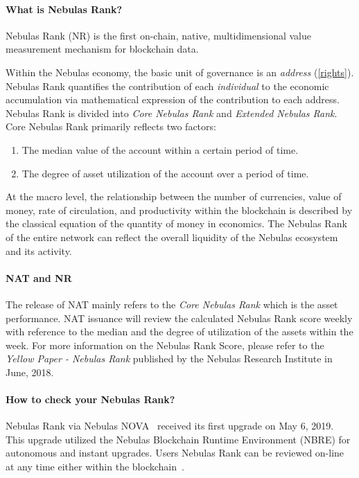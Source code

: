 \begin{center}
\colorbox{yellow!30}{
\begin{minipage}[c]{.8\textwidth}
	\paragraph{What is Nebulas Rank?}
	Nebulas Rank (NR) is the first on-chain, native, multidimensional value measurement mechanism for blockchain data.

  Within the Nebulas economy, the basic unit of governance is an \emph{address}
  (\ref{rights}). Nebulas Rank quantifies the contribution of each
  \emph{individual} to the economic accumulation via mathematical expression of
  the contribution to each address. Nebulas Rank is divided into \emph{Core
  Nebulas Rank} and \emph{Extended Nebulas Rank}. Core Nebulas Rank primarily reflects two factors:

	\begin{enumerate}
		\item The median value of the account within a certain period of time.
		\item The degree of asset utilization of the account over a period of time.
	\end{enumerate}

	At the macro level, the relationship between the number of currencies, value of money, rate of circulation, and productivity within the blockchain is described by the classical equation of the quantity of money in economics. The Nebulas Rank of the entire network can reflect the overall liquidity of the Nebulas ecosystem and its activity.


	\paragraph{NAT and NR}

  The release of NAT mainly refers to the \emph{Core Nebulas Rank} which is the asset performance. NAT issuance will review the calculated Nebulas Rank score weekly with reference to the median and the degree of utilization of the assets within the week. For more information on the Nebulas Rank Score, please refer to the \textit{Yellow Paper - Nebulas Rank} published by the Nebulas Research Institute in June, 2018.


	\paragraph{How to check your Nebulas Rank?}

Nebulas Rank via Nebulas NOVA~\cite{nova} received its first upgrade on May 6, 2019. This upgrade utilized the Nebulas Blockchain Runtime Environment (NBRE) for autonomous and instant upgrades. Users Nebulas Rank can be reviewed on-line at any time either within the blockchain~\cite{CheckNR}.


\end{minipage}}
\end{center}


